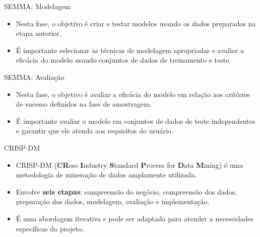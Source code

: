 \documentclass[
  ignorenonframetext,
  aspectratio=169,
]{beamer}
\providecommand{\tightlist}{%
  \setlength{\itemsep}{0pt}\setlength{\parskip}{0pt}}
\begin{document}
\begin{frame}{SEMMA: Modelagem}
\label{semma-modelagem}
\begin{itemize}
\tightlist
\item
  Nesta fase, o objetivo é criar e testar modelos usando os dados
  preparados na etapa anterior.
\end{itemize}

\pause

\begin{itemize}
\tightlist
\item
  É importante selecionar as técnicas de modelagem apropriadas e avaliar
  a eficácia do modelo usando conjuntos de dados de treinamento e teste.
\end{itemize}
\end{frame}

\begin{frame}{SEMMA: Avaliação}
\label{semma-avaliauxe7uxe3o}
\begin{itemize}
\tightlist
\item
  Nesta fase, o objetivo é avaliar a eficácia do modelo em relação aos
  critérios de sucesso definidos na fase de amostragem.
\end{itemize}

\pause

\begin{itemize}
\tightlist
\item
  É importante avaliar o modelo em conjuntos de dados de teste
  independentes e garantir que ele atenda aos requisitos do usuário.
\end{itemize}
\end{frame}

\begin{frame}{CRISP-DM}
\label{crisp-dm}
\begin{itemize}
\tightlist
\item
  CRISP-DM (\textbf{CR}oss \textbf{I}ndustry \textbf{S}tandard
  \textbf{P}rocess for \textbf{D}ata \textbf{M}ining) é uma metodologia
  de mineração de dados amplamente utilizada.
\end{itemize}

\pause

\begin{itemize}
\tightlist
\item
  Envolve \textbf{seis etapas}: compreensão do negócio, compreensão dos
  dados, preparação dos dados, modelagem, avaliação e implementação.
\end{itemize}

\pause

\begin{itemize}
\tightlist
\item
  É uma abordagem iterativa e pode ser adaptada para atender a
  necessidades específicas do projeto.
\end{itemize}
\end{frame}
\end{document}
